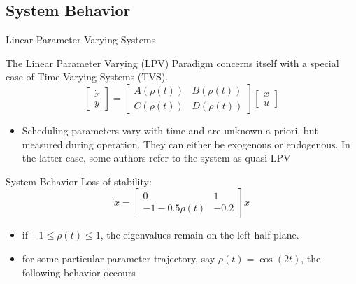 \subsection{System Behavior}

\begin{frame}{Linear Parameter Varying Systems}
\begin{block}{}
The Linear Parameter Varying (LPV) Paradigm concerns itself with a special case of Time Varying Systems (TVS). 
\begin{equation}  \label{eq:gen_LPV}
\begin{bmatrix}
\dot{x}\\
y
\end{bmatrix} = \begin{bmatrix}
A(\rho(t)) & B(\rho(t))\\
C(\rho(t)) & D(\rho(t))
\end{bmatrix}\begin{bmatrix}
x\\
u
\end{bmatrix}
\end{equation}
\end{block}

\begin{itemize}
	\item Scheduling parameters vary with time and are unknown a priori, but measured during operation. They can either be exogenous or endogenous. In the latter case, some authors refer to the system as quasi-LPV  \autocite{Sename}
\end{itemize}

\end{frame}

\begin{frame}{System Behavior}
Loss of stability:
\begin{equation}
\dot{x} = \begin{bmatrix} \label{eq:ex_sys}
0 & 1 \\
-1 -0.5\rho(t) & -0.2
\end{bmatrix}x
\end{equation}

    \begin{itemize}
        \item  if $-1 \leq \rho(t) \leq 1$, the eigenvalues remain on the left half plane.
        \item for some particular parameter trajectory, say $\rho(t) = \cos(2t)$, the following behavior occours
    \end{itemize}
\end{frame}


